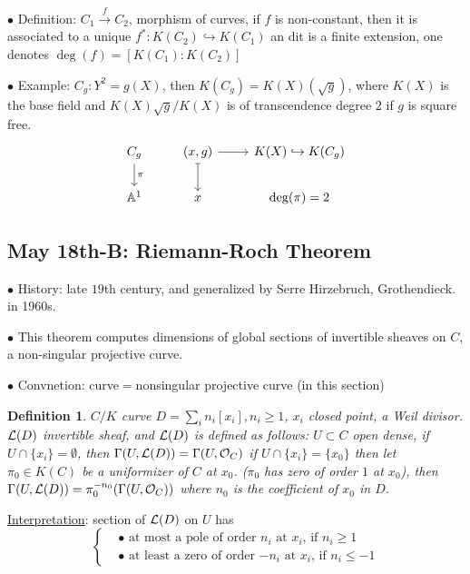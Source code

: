 \documentclass[11pt]{article}
\newtheorem{dfn}[thm]{Definition}
\newcommand{\affn}{\mathbb A}
\newcommand{\call}{{\cal L}}
\newcommand{\calo}{{\cal O}}
\newcommand{\lrta}{\longrightarrow}
\newcommand{\inj}{\hookrightarrow}
\begin{document}
$\bullet$ Definition: $C_1\overset{f}{\lrta}{C_2}$, morphism of curves, if $f$ is non-constant, then it is associated to a unique $f^*:K(C_2)\inj K(C_1)$ an dit is a finite extension, one denotes $\deg(f)=[K(C_1):K(C_2)]$

$\bullet$ Example: $C_g:Y^2=g(X)$, then $K(C_g)=K(X)(\sqrt{g})$, where $K(X)$ is the base field and $K(X)\sqrt{g}/K(X)$ is of transcendence degree $2$ if $g$ is square free.
$$
\begin{tikzcd}
C_g \arrow[d, "\pi"] & {(x,g)} \arrow[d, maps to] \arrow[r] & K(X)\inj K(C_g) \\
\affn^1 & x & \deg(\pi)=2
\end{tikzcd}
$$
\subsection{May 18th-B: Riemann-Roch Theorem}
$\bullet$ History: late $19$th century, and generalized by Serre Hirzebruch, Grothendieck. in 1960s.

$\bullet$ This theorem computes dimensions of global sections of invertible sheaves on $C$, a non-singular projective curve.

$\bullet$ Convnetion: curve$=$nonsingular projective curve (in this section)
\begin{dfn} $C/K$ curve $D=\sum_i n_i [x_i], n_i\geq 1$, $x_i$ closed point, a Weil divisor.  $\call(D)$ invertible sheaf, and $\call(D)$ is defined as follows:
$U\subset C$ open dense, if $U\cap \{x_i\}=\emptyset$, then $\Gamma(U,\call(D))=\Gamma(U,\calo_C)$ if $U\cap \{x_i\}=\{x_0\}$ then let $\pi_0\in K(C)$  be a uniformizer of $C$ at $x_0$.  ($\pi_0$ has zero of order $1$ at $x_0$), then $\Gamma(U,\call(D))=\pi_0^{-n_0}(\Gamma(U,\calo_C))$ where $n_0$ is the coefficient of $x_0$ in $D$.
\end{dfn}
\underline{Interpretation}: section of $\call(D)$ on $U$ has 
$$
\left\{
\begin{aligned}
&\bullet\text{ at most a pole of order $n_i$ at $x_i$, if $n_i\geq 1$}\\
&\bullet\text{ at least a zero of order $-n_i$ at $x_i$, if $n_i\leq -1$}
\end{aligned}\right.
$$
\end{document}
